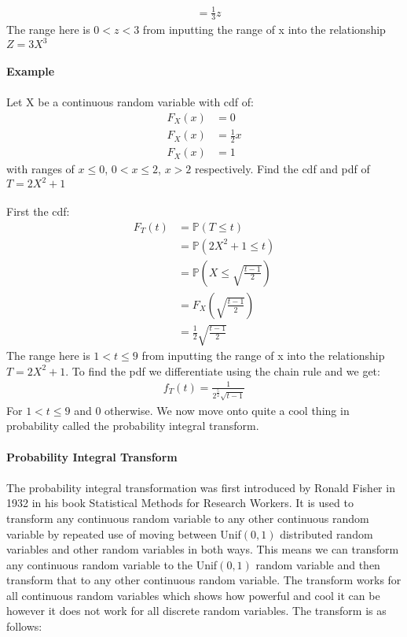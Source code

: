 \documentclass[,oneside]{article}
\begin{document}
\begin{enumerate}
\begin{align*}
&= \frac{1}{3}z
\end{align*}
The range here is $0 < z < 3$ from inputting the range of x into the relationship $Z = 3X^3$\\ \\
\textbf{Example}\\ \\
Let X be a continuous random variable with cdf of:
\begin{align*}
F_X(x) &= 0\\ 
F_X(x) &= \frac{1}{2}x\\
F_X(x) &= 1
\end{align*}
with ranges of $x \leq 0$, $0 < x \leq 2$, $x > 2$ respectively. Find the cdf and pdf of $T = 2X^2 + 1$\\ \\
First the cdf:
\begin{align*}
F_T(t)&= \mathbb{P}(T \leq t) \\
&= \mathbb{P}(2X^2+1 \leq t)\\
&= \mathbb{P}\left (X \leq \sqrt{\frac{t-1}{2}}\right )\\
&= F_X \left (\sqrt{\frac{t-1}{2}} \right )\\
&= \frac{1}{2} \sqrt{\frac{t-1}{2}}
\end{align*}
The range here is $1 < t \leq 9$ from inputting the range of x into the relationship $T = 2X^2 + 1$. To find the pdf we differentiate using the chain rule and we get:
\begin{align*}
f_T(t)=\frac{1}{2^{\frac{5}{2}}\sqrt{t-1}}
\end{align*}
For $1 < t \leq 9$ and 0 otherwise. We now move onto quite a cool thing in probability called the probability integral transform. \\ \\
\textbf{Probability Integral Transform}\\ \\
The probability integral transformation was first introduced by Ronald Fisher in 1932 in his book Statistical Methods for Research Workers. It is used to transform any continuous random variable to any other continuous random variable by repeated use of moving between Unif$(0,1)$ distributed random variables and other random variables in both ways. This means we can transform any continuous random variable to the Unif$(0,1)$ random variable and then transform that to any other continuous random variable. The transform works for all continuous random variables which shows how powerful and cool it can be however it does not work for all discrete random variables. The transform is as follows:\\ \\

\end{enumerate}
\end{document}
